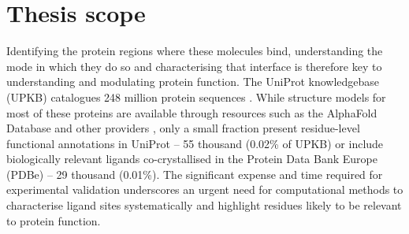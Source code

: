 \section{Thesis scope}

Identifying the protein regions where these molecules bind, understanding the mode in which they do so and characterising that interface is therefore key to understanding and modulating protein function. The UniProt knowledgebase (UPKB) catalogues 248 million protein sequences \cite{UNIPROT_2018_UNIPROT, UNIPROT_2023_UNIPROT}. While structure models for most of these proteins are available through resources such as the AlphaFold Database \cite{JUMPER_2021_ALPHAFOLD, VARADI_2022_ALPHAFOLDDB, ABRAMSON_2024_ALPHAFOLD3} and other providers \cite{GUEX_2009_SWISSMODEL, BEIENERT_2016_SWISSMODEL, WATERHOUSE_2018_SWISSMODEL}, only a small fraction present residue-level functional annotations in UniProt – 55 thousand (0.02\% of UPKB) or include biologically relevant ligands co-crystallised in the Protein Data Bank Europe (PDBe) \cite{BERMAN_2003_PDB, wwPDB_2019_PDB} – 29 thousand (0.01\%). The significant expense and time required for experimental validation underscores an urgent need for computational methods to characterise ligand sites  systematically and highlight residues likely to be relevant to protein function.


